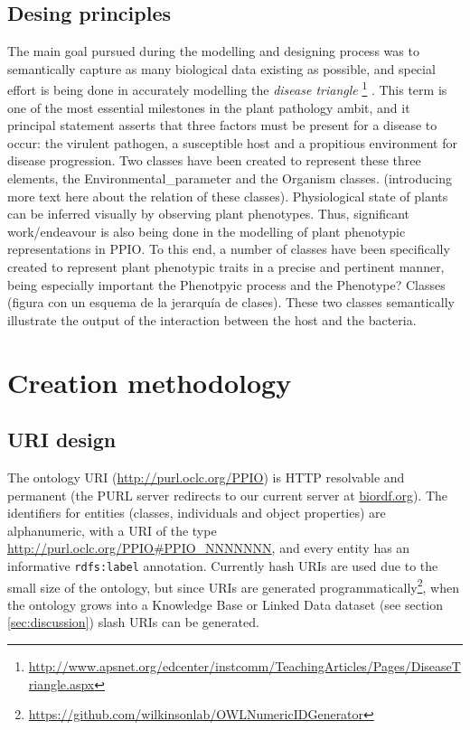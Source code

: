\documentclass[sw]{iosart2c}
\newcommand{\myurl}[1]{\footnote{\url{#1}}}
\newcommand{\con}[1]{\texttt{#1}\xspace}
\begin{document}
\subsection{Desing principles}

The main goal pursued during the modelling and designing process was to semantically capture as many biological data existing as possible, and special effort is being done in accurately modelling the {\itshape disease triangle} \myurl{http://www.apsnet.org/edcenter/instcomm/TeachingArticles/Pages/DiseaseTriangle.aspx} . This term is one of the most essential milestones in the plant pathology ambit, and it principal statement asserts that three factors must be present for a disease to occur: the virulent pathogen, a susceptible host and a propitious environment for disease progression. Two classes have been created to represent these three elements, the {\sf Environmental\_parameter} and the {\sf Organism} classes. (introducing more text here about the relation of these classes).
Physiological state of plants can be inferred visually by observing plant phenotypes. Thus, significant work/endeavour is also being done in the modelling of plant phenotypic representations in PPIO. To this end, a number of classes have been specifically created to represent plant phenotypic traits in a precise and pertinent manner, being especially important the Phenotpyic process and the Phenotype? Classes (figura con un esquema de la jerarquía de clases). These two classes semantically illustrate the output of the interaction between the host and the bacteria. 


\section{Creation methodology}

\subsection{URI design}
The ontology URI (\url{http://purl.oclc.org/PPIO}) is HTTP resolvable and permanent (the PURL server redirects to our current server at \url{biordf.org}). The identifiers for entities (classes, individuals and object properties) are alphanumeric, with a URI of the type \url{http://purl.oclc.org/PPIO#PPIO_NNNNNNN}, and every entity has an informative \con{rdfs:label} annotation. Currently hash URIs are used due to the small size of the ontology, but since URIs are generated programmatically\myurl{https://github.com/wilkinsonlab/OWLNumericIDGenerator}, when the ontology grows into a Knowledge Base or Linked Data dataset (see section \ref{sec:discussion}) slash URIs can be generated.
\end{document}
